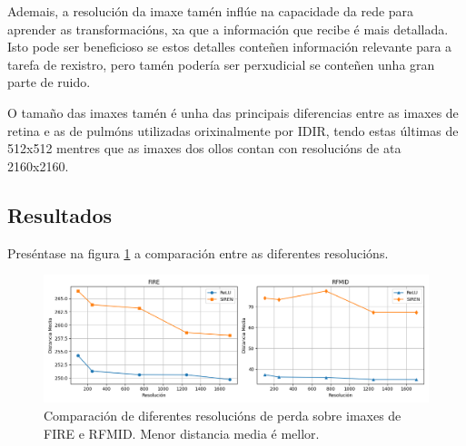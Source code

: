 Ademais, a resolución da imaxe tamén inflúe na capacidade da rede para aprender as transformacións, xa que a información que recibe é mais detallada. 
Isto pode ser beneficioso se estos detalles conteñen información relevante para a tarefa de rexistro, pero tamén podería ser perxudicial se conteñen unha gran parte de ruido.

O tamaño das imaxes tamén é unha das principais diferencias entre as imaxes de retina e as de pulmóns utilizadas orixinalmente por IDIR, tendo estas últimas de 512x512 mentres que as imaxes dos ollos contan con resolucións de ata 2160x2160.

\subsection{Resultados}
\label{subsec:Resultados-resolution}

Preséntase na figura \ref{fig:resoluciónchart} a comparación entre as diferentes resolucións.

\begin{figure}[tbp]
    \centering
    \includegraphics[width=1\textwidth]{imaxes/resolutionchart.png}
    \caption{Comparación de diferentes resolucións de perda sobre imaxes de FIRE e RFMID. Menor distancia media é mellor.}
    \label{fig:resoluciónchart}
\end{figure}


